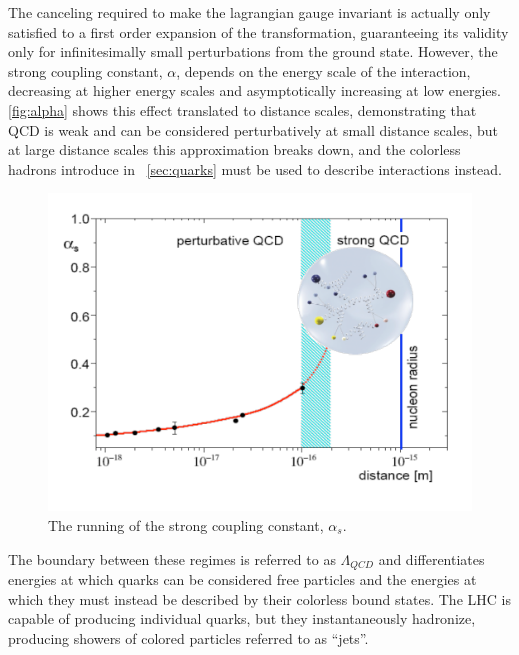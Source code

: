 The canceling required to make the lagrangian gauge invariant is actually only satisfied to a first order expansion of the transformation, guaranteeing its validity only for infinitesimally small perturbations from the ground state. However, the strong coupling constant, $\alpha$, depends on the energy scale of the interaction, decreasing at higher energy scales and asymptotically increasing at low energies. \autoref{fig:alpha} shows this effect translated to distance scales, demonstrating that QCD is weak and can be considered perturbatively at small distance scales, but at large distance scales this approximation breaks down, and the colorless hadrons introduce in ~\autoref{sec:quarks} must be used to describe interactions instead. 

\begin{centering}
\begin{figure}[bth]
\myfloatalign
\includegraphics[width=.85\linewidth]{figures/theory/strong_coupling.png}
\caption{The running of the strong coupling constant, $\alpha_s$. \cite{Messchendorp:2013ysj}}
\label{fig:alpha}
\end{figure}
\end{centering}

The boundary between these regimes is referred to as $\Lambda_{QCD}$ and differentiates energies at which quarks can be considered free particles and the energies at which they must instead be described by their colorless bound states. The \ac{LHC} is capable of producing individual quarks, but they instantaneously hadronize, producing showers of colored particles referred to as ``jets''. 



